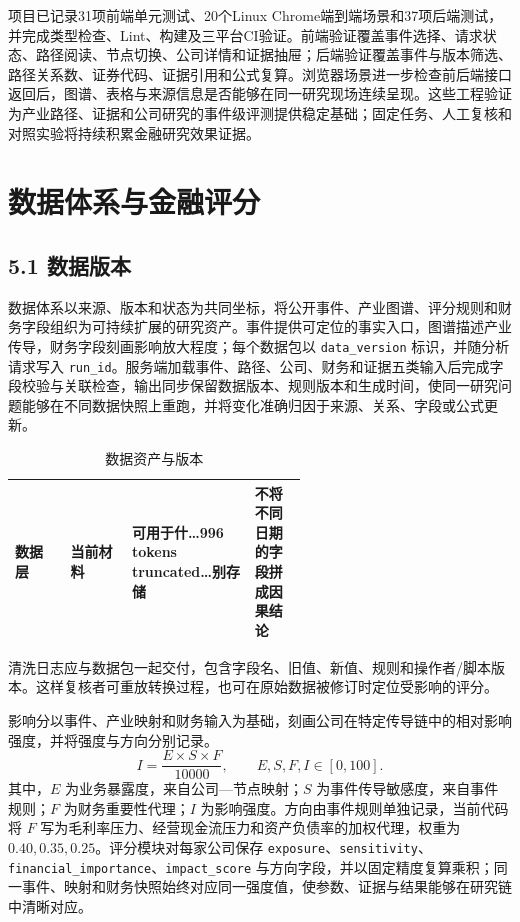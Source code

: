 项目已记录31项前端单元测试、20个Linux Chrome端到端场景和37项后端测试，并完成类型检查、Lint、构建及三平台CI验证\cite{lhy-repository,lhy-frontend}。前端验证覆盖事件选择、请求状态、路径阅读、节点切换、公司详情和证据抽屉；后端验证覆盖事件与版本筛选、路径关系数、证券代码、证据引用和公式复算。浏览器场景进一步检查前后端接口返回后，图谱、表格与来源信息是否能够在同一研究现场连续呈现。这些工程验证为产业路径、证据和公司研究的事件级评测提供稳定基础；固定任务、人工复核和对照实验将持续积累金融研究效果证据。


\section{数据体系与金融评分}
\subsection*{5.1 数据版本}\label{page:21}

数据体系以来源、版本和状态为共同坐标，将公开事件、产业图谱、评分规则和财务字段组织为可持续扩展的研究资产。事件提供可定位的事实入口，图谱描述产业传导，财务字段刻画影响放大程度；每个数据包以 \texttt{data\_version} 标识，并随分析请求写入 \texttt{run\_id}。服务端加载事件、路径、公司、财务和证据五类输入后完成字段校验与关联检查，输出同步保留数据版本、规则版本和生成时间，使同一研究问题能够在不同数据快照上重跑，并将变化准确归因于来源、关系、字段或公式更新。

\begin{table}[!htbp]
\centering
\caption{数据资产与版本}
\label{tab:wty-data-version}
\small
\begin{tabularx}{\linewidth}{p{0.19\linewidth}p{0.21\linewidth}X p{0.18\linewidth}}
\toprule
数据层 & 当前材料 & 可用于什…996 tokens truncated…别存储 & 不将不同日期的字段拼成因果结论 \\
\bottomrule
\end{tabularx}
\end{table}

清洗日志应与数据包一起交付，包含字段名、旧值、新值、规则和操作者/脚本版本。这样复核者可重放转换过程，也可在原始数据被修订时定位受影响的评分。


影响分以事件、产业映射和财务输入为基础，刻画公司在特定传导链中的相对影响强度，并将强度与方向分别记录。
\begin{equation}
I=\frac{E\times S\times F}{10000},\qquad E,S,F,I\in[0,100].\label{eq:wty-impact}
\end{equation}
其中，$E$ 为业务暴露度，来自公司—节点映射；$S$ 为事件传导敏感度，来自事件规则；$F$ 为财务重要性代理；$I$ 为影响强度。方向由事件规则单独记录，当前代码将 $F$ 写为毛利率压力、经营现金流压力和资产负债率的加权代理，权重为 $0.40,0.35,0.25$\cite{wty-repo-scoring}。评分模块对每家公司保存 \texttt{exposure}、\texttt{sensitivity}、\texttt{financial\_importance}、\texttt{impact\_score} 与方向字段，并以固定精度复算乘积；同一事件、映射和财务快照始终对应同一强度值，使参数、证据与结果能够在研究链中清晰对应。

